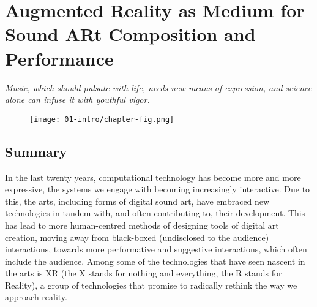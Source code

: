 \chapter{Augmented Reality as Medium for Sound ARt Composition and Performance}
\label{sec: introduction}
\epigraph{\emph{Music, which should pulsate with life, needs new means of expression, and science alone can infuse it with youthful vigor.}}{\citep{varese1966}}

\begin{figure}
    \centering
    \texttt{[image: 01-intro/chapter-fig.png]}
    \captionsetup{labelformat=empty}
    \caption[\autoref{sec: introduction}: \textit{polygons\textasciitilde{}} in performance at the Attenborough Centre for Creative Arts, University of Sussex, on June 8th, (from \citeauthor{bilbow2022a}, \citeyear{bilbow2022a})]{}
\end{figure}

\clearpage
\section{Summary}\label{sec: introduction-summary}
In the last twenty years, computational technology has become more and more expressive, the systems we engage with becoming increasingly interactive. Due to this, the arts, including forms of digital sound art, have embraced new technologies in tandem with, and often contributing to, their development. This has lead to more human-centred methods of designing tools of digital art creation, moving away from black-boxed (undisclosed to the audience) interactions, towards more performative and suggestive interactions, which often include the audience. Among some of the technologies that have seen nascent in the arts is XR (the X stands for nothing and everything, the R stands for Reality), a group of technologies that promise to radically rethink the way we approach reality. 

